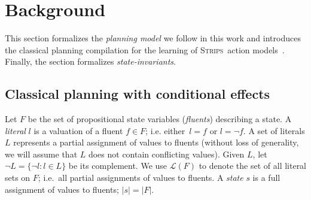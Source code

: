\documentclass{article}
\newcommand{\strips}{\textsc{Strips}}
\begin{document}




\section{Background}
\label{sec:background}
This section formalizes the {\em planning model} we follow in this work and introduces the classical planning compilation for the learning of \strips\ action models~\cite{aineto2018learning}. Finally, the section formalizes {\em state-invariants}.

\subsection{Classical planning with conditional effects}
Let $F$ be the set of  propositional state variables ({\em fluents}) describing a state. A {\em literal} $l$ is a valuation of a fluent $f\in F$; i.e. either~$l=f$ or $l=\neg f$. A set of literals $L$ represents a partial assignment of values to fluents (without loss of generality, we will assume that $L$ does not contain conflicting values). Given $L$, let $\neg L=\{\neg l:l\in L\}$ be its complement. We use $\mathcal{L}(F)$ to denote the set of all literal sets on $F$; i.e.~all partial assignments of values to fluents. A {\em state} $s$ is a full assignment of values to fluents; $|s|=|F|$.
\end{document}
